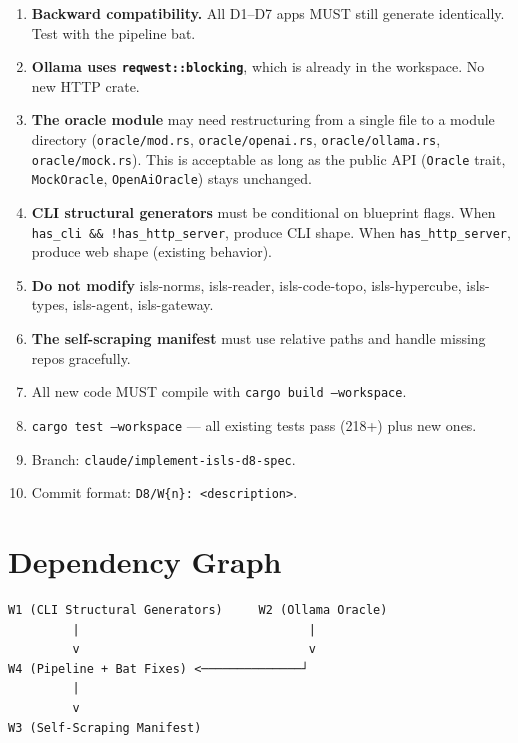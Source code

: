 \documentclass[11pt,a4paper]{article}
\begin{document}
\begin{enumerate}
\item \textbf{Backward compatibility.} All D1--D7 apps MUST still 
      generate identically. Test with the pipeline bat.
\item \textbf{Ollama uses \texttt{reqwest::blocking}}, which is 
      already in the workspace. No new HTTP crate.
\item \textbf{The oracle module} may need restructuring from a 
      single file to a module directory 
      (\texttt{oracle/mod.rs}, \texttt{oracle/openai.rs}, 
      \texttt{oracle/ollama.rs}, \texttt{oracle/mock.rs}).
      This is acceptable as long as the public API 
      (\texttt{Oracle} trait, \texttt{MockOracle}, 
      \texttt{OpenAiOracle}) stays unchanged.
\item \textbf{CLI structural generators} must be conditional on 
      blueprint flags. When \texttt{has\_cli \&\& !has\_http\_server}, 
      produce CLI shape. When \texttt{has\_http\_server}, produce 
      web shape (existing behavior).
\item \textbf{Do not modify} isls-norms, isls-reader, isls-code-topo, 
      isls-hypercube, isls-types, isls-agent, isls-gateway.
\item \textbf{The self-scraping manifest} must use relative paths 
      and handle missing repos gracefully.
\item All new code MUST compile with \texttt{cargo build --workspace}.
\item \texttt{cargo test --workspace} --- all existing tests pass 
      (218+) plus new ones.
\item Branch: \texttt{claude/implement-isls-d8-spec}.
\item Commit format: \texttt{D8/W\{n\}: <description>}.
\end{enumerate}


\section{Dependency Graph}

\begin{verbatim}
W1 (CLI Structural Generators)     W2 (Ollama Oracle)
         |                                |
         v                                v
W4 (Pipeline + Bat Fixes) <──────────────┘
         |
         v
W3 (Self-Scraping Manifest)
\end{verbatim}
\end{document}
